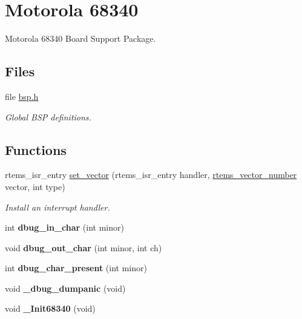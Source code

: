 \hypertarget{group__RTEMSBSPsM68kGen68340}{}\section{Motorola 68340}
\label{group__RTEMSBSPsM68kGen68340}


Motorola 68340 Board Support Package.  


\subsection*{Files}
\begin{DoxyCompactItemize}
\item 
file \mbox{\hyperlink{bsps_2m68k_2gen68340_2include_2bsp_8h}{bsp.\+h}}
\begin{DoxyCompactList}\small\item\em Global B\+SP definitions. \end{DoxyCompactList}\end{DoxyCompactItemize}
\subsection*{Functions}
\begin{DoxyCompactItemize}
\item 
rtems\+\_\+isr\+\_\+entry \mbox{\hyperlink{group__RTEMSBSPsM68kGen68340_gab3388042c56b34c40be81fd5f028d97e}{set\+\_\+vector}} (rtems\+\_\+isr\+\_\+entry handler, \mbox{\hyperlink{group__ClassicINTR_ga3e434c197d99f128e78cae4d9358bd8b}{rtems\+\_\+vector\+\_\+number}} vector, int type)
\begin{DoxyCompactList}\small\item\em Install an interrupt handler. \end{DoxyCompactList}\item 
\mbox{\label{group__RTEMSBSPsM68kGen68340_ga38ee135c020b1ee71670fda41869ed9c}} 
int {\bfseries dbug\+\_\+in\+\_\+char} (int minor)
\item 
\mbox{\label{group__RTEMSBSPsM68kGen68340_gabed2c799d1a73dd883d992c7a32172bc}} 
void {\bfseries dbug\+\_\+out\+\_\+char} (int minor, int ch)
\item 
\mbox{\label{group__RTEMSBSPsM68kGen68340_gabd9d5077d0808abe97e45286ca6fb21b}} 
int {\bfseries dbug\+\_\+char\+\_\+present} (int minor)
\item 
\mbox{\label{group__RTEMSBSPsM68kGen68340_gac08fb85db5a1afe725eab2c664a67ba7}} 
void {\bfseries \+\_\+dbug\+\_\+dumpanic} (void)
\item 
\mbox{\label{group__RTEMSBSPsM68kGen68340_ga653d933be1a13b4d33f019c85aef8d37}} 
void {\bfseries \+\_\+\+Init68340} (void)
\end{DoxyCompactItemize}
